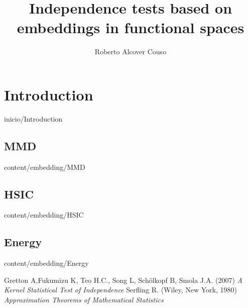 \documentclass[epsbased,copyright,final,printable,covers,extendedindex,firstnumbered,tfg,gnuplot]{tfgtfmthesisuam}
\title[Independence tests]{Independence tests based on embeddings in functional spaces}
\author{Roberto Alcover Couso}
\begin{document}
\chapter{Introduction\label{CAP:INTRODUCCION}}{inicio/Introduction}
	\section{MMD\label{SEC:MMD}}{content/embedding/MMD}
	\section{HSIC\label{SEC:HSIC}}{content/embedding/HSIC}
	\section{Energy\label{SEC:Energy}}{content/embedding/Energy}
\begin{thebibliography}{9}
 Gretton A,Fukumizu K, Teo H.C., Song L, Schölkopf B, Smola J.A.
(2007)
\textit{A Kernel Statistical Test of Independence}
 Serfling R.
(Wiley, New York, 1980)
\textit{Approximation Theorems of Mathematical Statistics}

\end{thebibliography}
\end{document}
